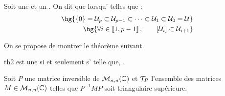 \documentclass[a4paper,french,bookmarks]{article}
\begin{document}
    \begin{definition}{}{}
        Soit \hg{$\bcU$} une  et  un . On dit que  lorsqu' telles que :
        \begin{align}
            \hg{\ens{0} = \bcU_p \subset \bcU_{p-1} \subset \dots \subset \bcU_1 \subset \bcU_0 = \bcU}\\
            \hg{\forall i \in \iint{1, p-1},\qquad \intc{\bcU_i} \subset \bcU_{i+1}}
        \end{align}
    \end{definition}
    On se propose de montrer le théorème suivant.
    
    \begin{theorem}{}{th2}
        \hg{$\bcU$} est une  si et seulement s' telle que, .
    \end{theorem}
    
    Soit $P$ une matrice inversible de $\mathcal{M}_{n, n}\!\left(\mathbb{C}\right)$ et $\mathcal{T}_P$ l'ensemble des matrices $M \in \mathcal{M}_{n, n}\!\left(\mathbb{C}\right)$ telles que $P^{-1}MP$ soit triangulaire supérieure.
    
\end{document}
